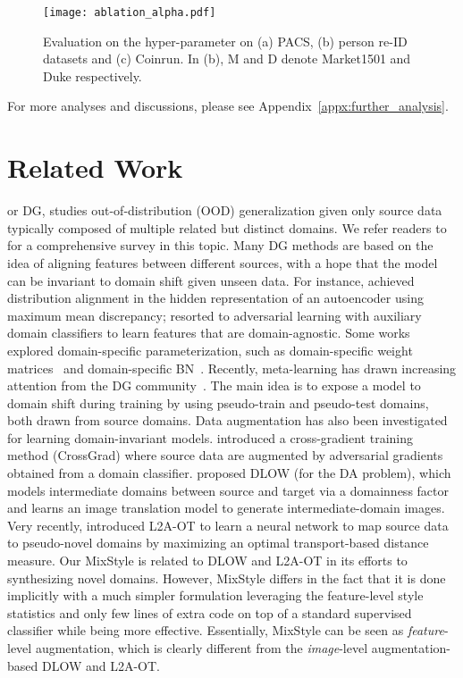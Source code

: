 \documentclass{article} \usepackage{iclr2021_conference,times}
\makeatletter
\renewcommand\paragraph{\@startsection{paragraph}{4}{\z@}{.1em \@plus1ex \@minus.2ex}{-.5em}{\normalfont\normalsize\bfseries}}
\makeatother
\begin{document}
\begin{figure}[t]
    \centering
    \texttt{[image: ablation\_alpha.pdf]}
    \caption{Evaluation on the hyper-parameter  on (a) PACS, (b) person re-ID datasets and (c) Coinrun. In (b), M and D denote Market1501 and Duke respectively.}
    \label{fig:ablation_alpha}
\end{figure}

For more analyses and discussions, please see Appendix~\ref{appx:further_analysis}.


\section{Related Work}
\paragraph{Domain generalization,}
or DG, studies out-of-distribution (OOD) generalization given only source data typically composed of multiple related but distinct domains. We refer readers to~\citet{zhou2021domain} for a comprehensive survey in this topic. Many DG methods are based on the idea of aligning features between different sources, with a hope that the model can be invariant to domain shift given unseen data. For instance, \citet{li2018mmdaae} achieved distribution alignment in the hidden representation of an autoencoder using maximum mean discrepancy; \citet{li2018ciddg} resorted to adversarial learning with auxiliary domain classifiers to learn features that are domain-agnostic. Some works explored domain-specific parameterization, such as domain-specific weight matrices~\citep{li2017deeper} and domain-specific BN~\citep{seo2020learning}. Recently, meta-learning has drawn increasing attention from the DG community~\citep{li2018learning,balaji2018metareg,dou2019domain}. The main idea is to expose a model to domain shift during training by using pseudo-train and pseudo-test domains, both drawn from source domains. Data augmentation has also been investigated for learning domain-invariant models. \citet{shankar2018generalizing} introduced a cross-gradient training method (CrossGrad) where source data are augmented by adversarial gradients obtained from a domain classifier. \citet{gong2018dlow} proposed DLOW (for the DA problem), which models intermediate domains between source and target via a domainness factor and learns an image translation model to generate intermediate-domain images. Very recently, \citet{zhou2020learning} introduced L2A-OT to learn a neural network to map source data to pseudo-novel domains by maximizing an optimal transport-based distance measure. Our MixStyle is related to DLOW and L2A-OT in its efforts to synthesizing novel domains. However, MixStyle differs in the fact that it is done implicitly with a much simpler formulation leveraging the feature-level style statistics and only few lines of extra code on top of a standard supervised classifier while being more effective. Essentially, MixStyle can be seen as \emph{feature}-level augmentation, which is clearly different from the \emph{image}-level augmentation-based DLOW and L2A-OT.
\end{document}
